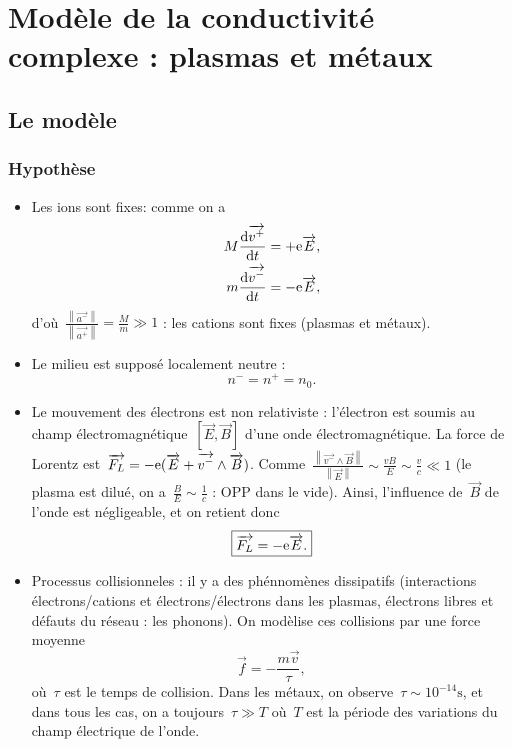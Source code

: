 \section[Modèle de la conductivité complexe]{Modèle de la conductivité complexe : plasmas et métaux}

\subsection{Le modèle}

\subsubsection{Hypothèse}
\begin{itemize}
    \item Les ions sont fixes: comme on a
    \begin{equation*}
        \begin{aligned}
            M\frac{\mathrm{d}\protect\overrightarrow{{v^{+}}}}{\mathrm{d} t}&=+\mathrm{e}\protect\overrightarrow{{E}},\\
            m\frac{\mathrm{d}\protect\overrightarrow{{v^{-}}}}{\mathrm{d} t}&=-\mathrm{e}\protect\overrightarrow{{E}},
        \end{aligned}
    \end{equation*}
    d'où~$\frac{\left\lVert\vec{a^{-}}\right\rVert}{\left\lVert\vec{a^{+}}\right\rVert}=\frac{M}{m}\gg1$ : les cations sont fixes (plasmas et métaux).
    \item Le milieu est supposé localement neutre :
    \begin{equation*}
        \boxed{
            n^{-}=n^{+}=n_0.
        }
    \end{equation*}
    \item Le mouvement des électrons est non relativiste : l'électron est soumis au champ électromagnétique~$[\vec{E},\vec{B}]$ d'une onde électromagnétique. La force de Lorentz est~$\protect\overrightarrow{{F_L}}=-\mathrm{e}(\protect\overrightarrow{{E}}+\protect\overrightarrow{{v^{-}}}\wedge\protect\overrightarrow{{B}})$. Comme~$\frac{\left\lVert\vec{v^{-}}\wedge\vec{B}\right\rVert}{\left\lVert\vec{E}\right\rVert}\sim\frac{vB}{E}\sim\frac{v}{c}\ll1$ (le plasma est dilué, on a~$\frac{B}{E}\sim\frac{1}{c}$ : OPP dans le vide). Ainsi, l'influence de~$\vec{B}$ de l'onde est négligeable, et on retient donc
    \begin{equation*}
        \boxed{
            \protect\overrightarrow{{F_L}}=-\mathrm{e}\protect\overrightarrow{{E}}.
        }
    \end{equation*}
    \item Processus collisionneles : il y a des phénnomènes dissipatifs (interactions électrons/cations et électrons/électrons dans les plasmas, électrons libres et défauts du réseau : les \og phonons\fg). On modèlise ces collisions par une force moyenne
    \begin{equation*}
        \boxed{
            \vec{f}=-\frac{m\vec{v}}{\tau},
        }
    \end{equation*}
    où~$\tau$ est le temps de collision. Dans les métaux, on observe~$\tau\sim10^{-14}\si{\second}$, et dans tous les cas, on a toujours~$\tau\gg T$ où~$T$ est la période des variations du champ électrique de l'onde.
\end{itemize}

